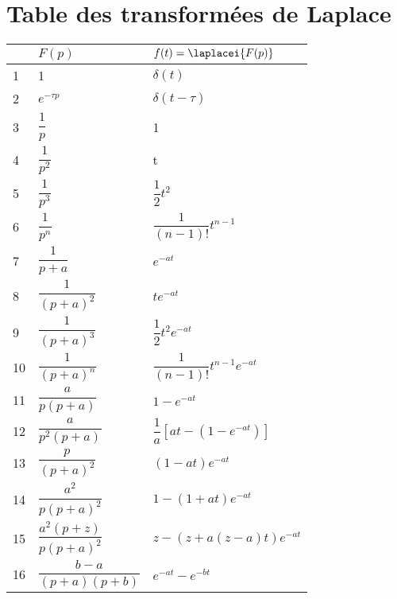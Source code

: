 \section{Table des transformées de Laplace}
\begin{table}[!h]
    \centering
    \begin{tabular}{@{}P{0.5cm}P{3.9cm}P{8.9cm}@{}}
    \toprule
    & $F(p)$ & $f(t)=\laplacei{F(p)}$ \\
     & 
    1 & 
    $\delta(t)$ \\
    2 & 
    $e^{-\tau p}$ & 
    $\delta(t-\tau)$ \\
    3 & 
    $\dfrac{1}{p}$ &
    1 \\
    4 & 
    $\dfrac{1}{p^2}$ &
    t \\
    5 & 
    $\dfrac{1}{p^3}$ & 
    $\dfrac{1}{2}t^2$ \\
    6 & 
    $\dfrac{1}{p^n}$ & 
    $\dfrac{1}{(n-1)!}t^{n-1}$ \\
    7 & 
    $\dfrac{1}{p+a}$ & 
    $e^{-at}$ \\
    8 & 
    $\dfrac{1}{(p+a)^2}$ & 
    $te^{-at}$ \\
    9 & 
    $\dfrac{1}{(p+a)^3}$ & 
    $\dfrac{1}{2}t^2e^{-at}$ \\
    10 & 
    $\dfrac{1}{(p+a)^n}$ & 
    $\dfrac{1}{(n-1)!}t^{n-1}e^{-at}$ \\
    11 & 
    $\dfrac{a}{p(p+a)}$ & 
    $1-e^{-at}$ \\
    12 & 
    $\dfrac{a}{p^2(p+a)}$ & 
    $\dfrac{1}{a}\left[at-\left(1-e^{-at}\right)\right]$\\
    13 & 
    $\dfrac{p}{(p+a)^2}$ & 
    $(1-at)e^{-at}$ \\
    14 & 
    $\dfrac{a^2}{p(p+a)^2}$ & 
    $1-(1+at)e^{-at}$ \\
    15 & 
    $\dfrac{a^2(p+z)}{p(p+a)^2}$ & 
    $z-\left(z+a(z-a)t\right)e^{-at}$ \\
    16 & 
    $\dfrac{b-a}{(p+a)(p+b)}$ & 
    $e^{-at}-e^{-bt}$ \\
    \bottomrule
    \end{tabular}
\end{table}
